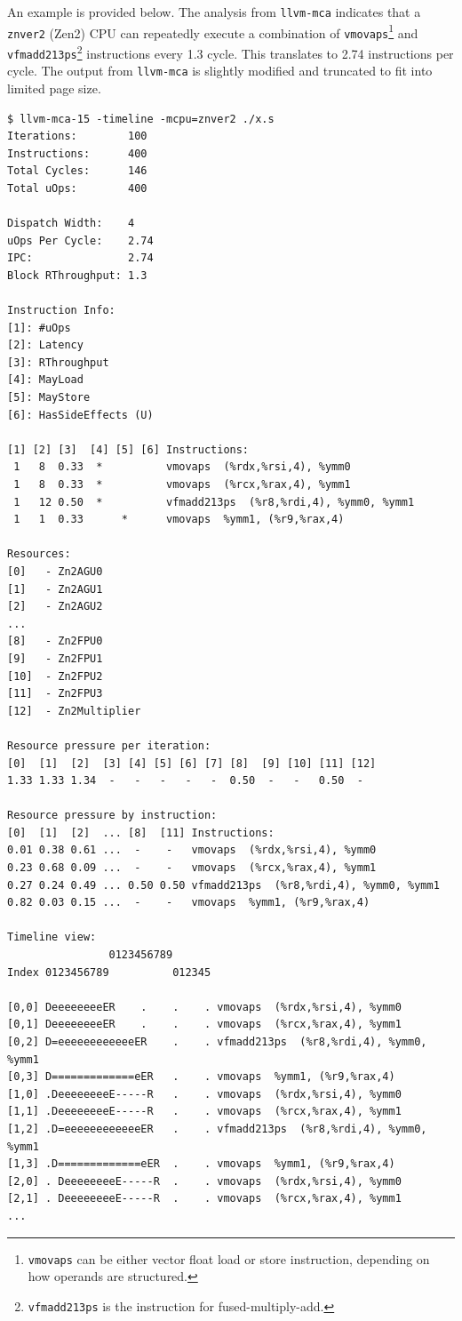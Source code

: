 \documentclass[logo,bsc,singlespacing,parskip]{infthesis}
\newcommand{\mca}{\texttt{llvm-mca}}
\begin{document}
An example is provided below. The analysis from \mca{} indicates that a \texttt{znver2}
(Zen2) CPU can repeatedly execute a combination of 
\texttt{vmovaps}\footnote{\texttt{vmovaps} can be either vector float load or 
store instruction, depending on how operands are structured.}
and \texttt{vfmadd213ps}\footnote{\texttt{vfmadd213ps} is the instruction for 
fused-multiply-add.}
instructions every 1.3 cycle. This translates to 2.74 instructions per cycle. 
The output from \mca{} is slightly modified and truncated to fit into 
limited page size. 

\begin{verbatim}
$ llvm-mca-15 -timeline -mcpu=znver2 ./x.s 
Iterations:        100
Instructions:      400
Total Cycles:      146
Total uOps:        400

Dispatch Width:    4
uOps Per Cycle:    2.74
IPC:               2.74
Block RThroughput: 1.3

Instruction Info:
[1]: #uOps
[2]: Latency
[3]: RThroughput
[4]: MayLoad
[5]: MayStore
[6]: HasSideEffects (U)

[1] [2] [3]  [4] [5] [6] Instructions:
 1   8  0.33  *          vmovaps  (%rdx,%rsi,4), %ymm0
 1   8  0.33  *          vmovaps  (%rcx,%rax,4), %ymm1
 1   12 0.50  *          vfmadd213ps  (%r8,%rdi,4), %ymm0, %ymm1
 1   1  0.33      *      vmovaps  %ymm1, (%r9,%rax,4)

Resources:
[0]   - Zn2AGU0
[1]   - Zn2AGU1
[2]   - Zn2AGU2
...
[8]   - Zn2FPU0
[9]   - Zn2FPU1
[10]  - Zn2FPU2
[11]  - Zn2FPU3
[12]  - Zn2Multiplier

Resource pressure per iteration:
[0]  [1]  [2]  [3] [4] [5] [6] [7] [8]  [9] [10] [11] [12]   
1.33 1.33 1.34  -   -   -   -   -  0.50  -   -   0.50  -     

Resource pressure by instruction:
[0]  [1]  [2]  ... [8]  [11] Instructions:
0.01 0.38 0.61 ...  -    -   vmovaps  (%rdx,%rsi,4), %ymm0
0.23 0.68 0.09 ...  -    -   vmovaps  (%rcx,%rax,4), %ymm1
0.27 0.24 0.49 ... 0.50 0.50 vfmadd213ps  (%r8,%rdi,4), %ymm0, %ymm1
0.82 0.03 0.15 ...  -    -   vmovaps  %ymm1, (%r9,%rax,4)

Timeline view:
                0123456789      
Index 0123456789          012345

[0,0] DeeeeeeeeER    .    .    . vmovaps  (%rdx,%rsi,4), %ymm0
[0,1] DeeeeeeeeER    .    .    . vmovaps  (%rcx,%rax,4), %ymm1
[0,2] D=eeeeeeeeeeeeER    .    . vfmadd213ps  (%r8,%rdi,4), %ymm0, %ymm1
[0,3] D=============eER   .    . vmovaps  %ymm1, (%r9,%rax,4)
[1,0] .DeeeeeeeeE-----R   .    . vmovaps  (%rdx,%rsi,4), %ymm0
[1,1] .DeeeeeeeeE-----R   .    . vmovaps  (%rcx,%rax,4), %ymm1
[1,2] .D=eeeeeeeeeeeeER   .    . vfmadd213ps  (%r8,%rdi,4), %ymm0, %ymm1
[1,3] .D=============eER  .    . vmovaps  %ymm1, (%r9,%rax,4)
[2,0] . DeeeeeeeeE-----R  .    . vmovaps  (%rdx,%rsi,4), %ymm0
[2,1] . DeeeeeeeeE-----R  .    . vmovaps  (%rcx,%rax,4), %ymm1
...

\end{verbatim}
\end{document}
